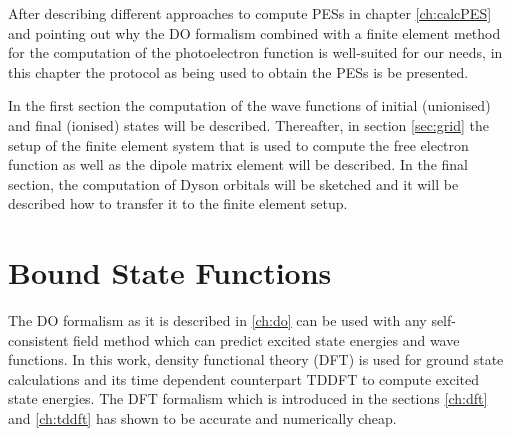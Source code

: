 After describing different approaches to compute PESs in chapter \ref{ch:calcPES} and pointing out why the DO formalism combined with a finite element method for the computation of the photoelectron function is well-suited for our needs, in this chapter the protocol as being used to obtain the PESs is be presented.

In the first section the computation of the wave functions of initial (unionised) and final (ionised) states will be described.
Thereafter, in section \ref{sec:grid} the setup of the finite element system that is used to compute the free electron function as well as the dipole matrix element will be described.
In the final section, the computation of Dyson orbitals will be sketched and it will be described how to transfer it to the finite element setup.

\section{Bound State Functions}
The DO formalism as it is described in \ref{ch:do} can be used with any self-consistent field method which can predict excited state energies and wave functions.
In this work,  density functional theory (DFT) is used for ground state calculations and its time dependent counterpart TDDFT to compute excited state energies.
The DFT formalism which is introduced in the sections \ref{ch:dft} and \ref{ch:tddft} has shown to be accurate and numerically cheap.

